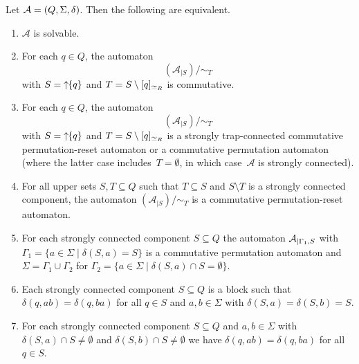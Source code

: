\begin{theorem}\label{prelim:classes:solvable:thm}
Let $\mathcal A = (Q, \Sigma, \delta)$.
Then the following are equivalent.
\begin{enumerate}
\item \label{prelim:classes:solvable:thm:char:solvable} $\mathcal A$ is solvable.

\item \label{prelim:classes:solvable:thm:char:SCC-quotients-comm}  For each $q \in Q$, the automaton
\[
( \mathcal A_{|S} ) / {\sim_T}
\]
with $S = \mbox{\ensuremath{\displaystyle \uparrow \!\!\{q\}}}$ and $T = S \setminus [q]_{\simeq_R}$ %
is commutative.

\item \label{prelim:classes:solvable:thm:char:SCC-quotients-comm-perm}  For each $q \in Q$, the automaton
\[ 
( \mathcal A_{|S} ) / {\sim_T}
\]
with $S = \mbox{\ensuremath{\displaystyle \uparrow \!\!\{q\}}}$ and $T = S \setminus [q]_{\simeq_R}$ %
is a strongly trap-connected commutative permutation-reset automaton
or a commutative permutation automaton (where the latter case includes~$T = \emptyset$, in which case~$\mathcal A$
is strongly connected).

\item \label{prelim:subclasses:thm:solvable:permutation-reset} For all upper sets $S, T \subseteq Q$
such that $T \subseteq S$ and $S \setminus T$ 
is a strongly connected component, the automaton $( \mathcal A_{|S} ) / {\sim_T}$
is a commutative permutation-reset automaton.




\item \label{prelim:subclasses:thm:solvable:restrict} For each strongly connected component $S \subseteq Q$
the automaton $\mathcal A_{|\Gamma_1, S}$
with $\Gamma_1 = \{ a \in \Sigma \mid \delta(S, a) = S \}$
is a commutative permutation automaton 
and $\Sigma = \Gamma_1 \cup \Gamma_2$
for $\Gamma_2 = \{ a \in \Sigma \mid \delta(S, a) \cap S = \emptyset \}$.



\item \label{prelim:prop:solvable-SCC:2} Each strongly connected component $S \subseteq Q$ is a block
such that $\delta(q, ab) = \delta(q, ba)$
for all $q \in S$ and $a,b \in \Sigma$
with $\delta(S, a) = \delta(S, b) = S$.

\item \label{prelim:prop:solvable-SCC:3a} For each strongly connected component $S \subseteq Q$
and $a,b \in \Sigma$ with $\delta(S, a) \cap S \ne \emptyset$
and $\delta(S, b) \cap S \ne \emptyset$
we have $\delta(q, ab) = \delta(q, ba)$ for all $q \in S$.


\end{enumerate}
\end{theorem}
